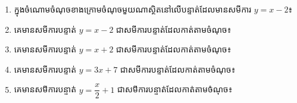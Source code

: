 \begin{enumerate}
\item ក្នុងចំណោមចំណុចខាងក្រោមចំណុចមួយណាស្ថិតនៅលើបន្ទាត់ដែលមានសមីការ $y=x-2$៖
\begin{enumerate}[label=\alph*.]
\end{enumerate}

\item គេមានសមីការបន្ទាត់ $y=x-2$ ជាសមីការបន្ទាត់ដែលកាត់តាមចំណុច៖
\begin{enumerate}[label=\alph*.]
\end{enumerate}

\item គេមានសមីការបន្ទាត់ $y=x+2$ ជាសមីការបន្ទាត់ដែលកាត់តាមចំណុច៖
\begin{enumerate}[label=\alph*.]
\end{enumerate}

\item គេមានសមីការបន្ទាត់ $y=3x+7$ ជាសមីការបន្ទាត់ដែលកាត់តាមចំណុច៖
\begin{enumerate}[label=\alph*.]
\end{enumerate}

\item គេមានសមីការបន្ទាត់ $y=\dfrac{x}{2}+1$ ជាសមីការបន្ទាត់ដែលកាត់តាមចំណុច៖
\begin{enumerate}[label=\alph*.]
\end{enumerate}


\end{enumerate}
